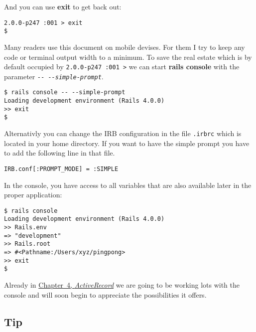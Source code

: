 \documentclass[a4paper]{book}
\begin{document}
And you can use \textbf{exit} to get back out:

\begin{shaded}\begin{verbatim}
2.0.0-p247 :001 > exit
$
\end{verbatim}\end{shaded}

Many readers use this document on mobile devises. For them I try to keep any code or terminal output width to a minimum. To save the real estate which is by default occupied by \texttt{2.0.0-p247 :001 \textgreater{}} we can start \textbf{rails console} with the parameter \emph{\texttt{-{}- -{}-simple-prompt}}.

\begin{shaded}\begin{verbatim}
$ rails console -- --simple-prompt
Loading development environment (Rails 4.0.0)
>> exit
$
\end{verbatim}\end{shaded}

Alternativly you can change the IRB configuration in the file \texttt{.irbrc} which is located in your home directory. If you want to have the simple prompt you have to add the following line in that file.

\begin{shaded}\begin{verbatim}
IRB.conf[:PROMPT_MODE] = :SIMPLE
\end{verbatim}\end{shaded}

In the console, you have access to all variables that are also available later in the proper application:

\begin{shaded}\begin{verbatim}
$ rails console
Loading development environment (Rails 4.0.0)
>> Rails.env
=> "development"
>> Rails.root
=> #<Pathname:/Users/xyz/pingpong>
>> exit
$
\end{verbatim}\end{shaded}

Already in \hyperref[activerecordux5fchapter]{Chapter~4, \emph{ActiveRecord}} we are going to be working lots with the console and will soon begin to appreciate the possibilities it offers.

\subsection{Tip}\label{tip-4}
\end{document}
